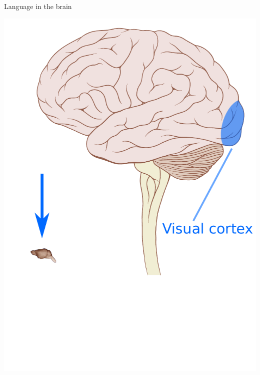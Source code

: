 \documentclass[xcolor=x11names,compress]{beamer}
\renewcommand{\(}{\begin{columns}}
\renewcommand{\)}{\end{columns}}
\newcommand{\<}[1]{\begin{column}{#1}}
\renewcommand{\>}{\end{column}}
\begin{document}
\begin{frame}[t]{Language in the brain}
\begin{center}
{    \includegraphics[height=0.9\textheight]{brain5}
    }
\end{center}
\end{frame}
\end{document}
